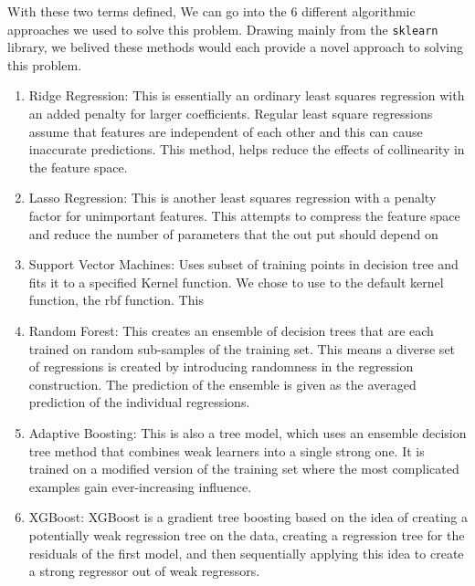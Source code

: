 \documentclass[12pt]{article}
\theoremstyle{definition}
\theoremstyle{remark}
\begin{document}
With these two terms defined, We can go into the 6 different algorithmic
approaches we used to solve this problem. Drawing mainly from the
\texttt{sklearn} library, we belived these methods would each provide a novel
approach to solving this problem.
\begin{enumerate}
\item Ridge Regression: This is essentially an ordinary least squares regression
  with an added penalty for larger coefficients. Regular least square
  regressions assume that features are independent of each other and this can
  cause inaccurate predictions. This method, helps reduce the effects of
  collinearity in the feature space.
\item Lasso Regression: This is another least squares regression with a penalty
  factor for unimportant features. This attempts to compress the feature space
  and reduce the number of parameters that the out put should depend on
\item Support Vector Machines: Uses subset of training points in decision tree
  and fits it to a specified Kernel function. We chose to use to the default
  kernel function, the rbf function. This
    
\item Random Forest: This creates an ensemble of decision trees that are each
  trained on random sub-samples of the training set. This means a diverse set of
  regressions is created by introducing randomness in the regression
  construction. The prediction of the ensemble is given as the averaged
  prediction of the individual regressions.
\item Adaptive Boosting: This is also a tree model, which uses an ensemble
  decision tree method that combines weak learners into a single strong one. It
  is trained on a modified version of the training set where the most
  complicated examples gain ever-increasing influence.
\item XGBoost: XGBoost is a gradient tree boosting based on the idea of
  creating a potentially weak regression tree on the data, creating a regression
  tree for the residuals of the first model, and then sequentially applying this
  idea to create a strong regressor out of weak regressors.
\end{enumerate}
\end{document}
